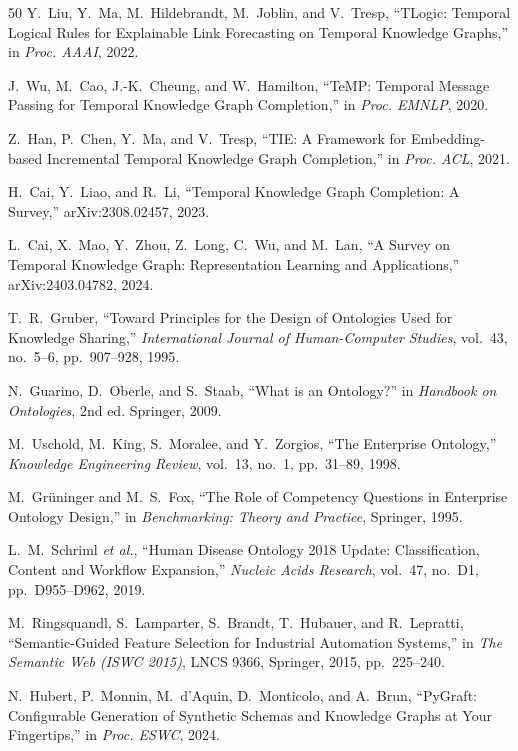 \documentclass{ieeeaccess}
\begin{document}
\begin{thebibliography}{50}
Y.~Liu, Y.~Ma, M.~Hildebrandt, M.~Joblin, and V.~Tresp, ``TLogic: Temporal Logical Rules for Explainable Link Forecasting on Temporal Knowledge Graphs,'' in \textit{Proc. AAAI}, 2022.

J.~Wu, M.~Cao, J.-K.~Cheung, and W.~Hamilton, ``TeMP: Temporal Message Passing for Temporal Knowledge Graph Completion,'' in \textit{Proc. EMNLP}, 2020.

Z.~Han, P.~Chen, Y.~Ma, and V.~Tresp, ``TIE: A Framework for Embedding-based Incremental Temporal Knowledge Graph Completion,'' in \textit{Proc. ACL}, 2021.

H.~Cai, Y.~Liao, and R.~Li, ``Temporal Knowledge Graph Completion: A Survey,'' arXiv:2308.02457, 2023.

L.~Cai, X.~Mao, Y.~Zhou, Z.~Long, C.~Wu, and M.~Lan, ``A Survey on Temporal Knowledge Graph: Representation Learning and Applications,'' arXiv:2403.04782, 2024.

T.~R.~Gruber, ``Toward Principles for the Design of Ontologies Used for Knowledge Sharing,'' \textit{International Journal of Human-Computer Studies}, vol.~43, no.~5--6, pp.~907--928, 1995.

N.~Guarino, D.~Oberle, and S.~Staab, ``What is an Ontology?'' in \textit{Handbook on Ontologies}, 2nd ed. Springer, 2009.

M.~Uschold, M.~King, S.~Moralee, and Y.~Zorgios, ``The Enterprise Ontology,'' \textit{Knowledge Engineering Review}, vol.~13, no.~1, pp.~31--89, 1998.

M.~Gr\"{u}ninger and M.~S.~Fox, ``The Role of Competency Questions in Enterprise Ontology Design,'' in \textit{Benchmarking: Theory and Practice}, Springer, 1995.

L.~M.~Schriml \textit{et al.}, ``Human Disease Ontology 2018 Update: Classification, Content and Workflow Expansion,'' \textit{Nucleic Acids Research}, vol.~47, no.~D1, pp.~D955--D962, 2019.

M.~Ringsquandl, S.~Lamparter, S.~Brandt, T.~Hubauer, and R.~Lepratti, ``Semantic-Guided Feature Selection for Industrial Automation Systems,'' in \textit{The Semantic Web (ISWC 2015)}, LNCS 9366, Springer, 2015, pp.~225--240.

N.~Hubert, P.~Monnin, M.~d'Aquin, D.~Monticolo, and A.~Brun, ``PyGraft: Configurable Generation of Synthetic Schemas and Knowledge Graphs at Your Fingertips,'' in \textit{Proc. ESWC}, 2024.


\end{thebibliography}
\end{document}
